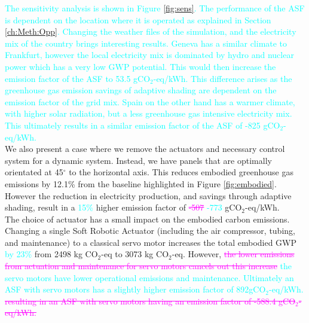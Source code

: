 \textcolor{cyan}{The sensitivity analysis is shown in Figure \ref{fig:sens}. The performance of the ASF is dependent on the location where it is operated as explained in Section \ref{ch:Meth:Opp}. Changing the weather files of the simulation, and the electricity mix of the country brings interesting results. Geneva has a similar climate to Frankfurt, however the local electricity mix is dominated by hydro and nuclear power which has a very low GWP potential\cite{itten2012life}. This would then increase the emission factor of the ASF to 53.5 gCO$_{2}$-eq/kWh. This difference arises as the greenhouse gas emission savings of adaptive shading are dependent on the emission factor of the grid mix.
Spain on the other hand has a warmer climate, with higher solar radiation, but a less greenhouse gas intensive electricity mix. This ultimately results in a similar emission factor of the ASF of -825 gCO$_{2}$-eq/kWh.}\\


We also present a case where we remove the actuators and necessary control system for a dynamic system. Instead, we have panels that are optimally orientated at 45$^{\circ}$ to the horizontal axis. This reduces embodied greenhouse gas emissions by 12.1\% from the baseline highlighted in Figure \ref{fig:embodied}. However the reduction in electricity production, and savings through adaptive shading, result in a \textcolor{cyan}{15\% }higher emission factor of \textcolor{magenta}{\sout{-507}} \textcolor{cyan}{-773} gCO$_{2}$-eq/kWh.\\

The choice of actuator has a small impact on the embodied carbon emissions. Changing a single Soft Robotic Actuator (including the air compressor, tubing, and maintenance) to a classical servo motor increases the total embodied GWP \textcolor{cyan}{by 23\% }from 2498 kg CO$_{2}$-eq to 3073 kg CO$_{2}$-eq. However, \textcolor{magenta}{\sout{the lower emissions from actuation and maintenance for servo motors cancels out this increase}} \textcolor{cyan}{the servo motors have lower operational emissions and maintenance. Ultimately an ASF with servo motors has a slightly higher emission factor of 892gCO$_{2}$-eq/kWh.} \textcolor{magenta}{\sout{resulting in an ASF with servo motors having an emission factor of -588.4 gCO$_{2}$-eq/kWh.}}\\

